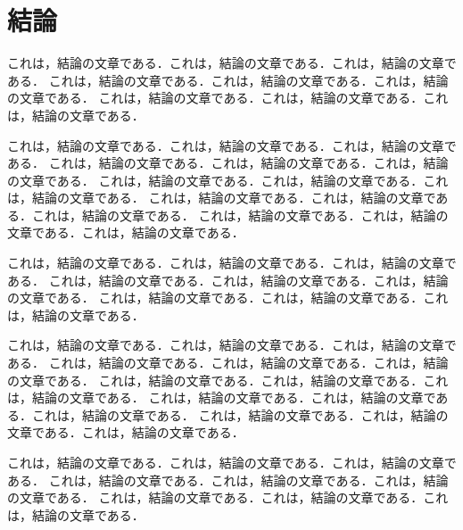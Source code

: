 \chapter{結論} \label{chap:conclusion}

これは，結論の文章である．これは，結論の文章である．これは，結論の文章である．
これは，結論の文章である．これは，結論の文章である．これは，結論の文章である．
これは，結論の文章である．これは，結論の文章である．これは，結論の文章である．

これは，結論の文章である．これは，結論の文章である．これは，結論の文章である．
これは，結論の文章である．これは，結論の文章である．これは，結論の文章である．
これは，結論の文章である．これは，結論の文章である．これは，結論の文章である．
これは，結論の文章である．これは，結論の文章である．これは，結論の文章である．
これは，結論の文章である．これは，結論の文章である．これは，結論の文章である．

これは，結論の文章である．これは，結論の文章である．これは，結論の文章である．
これは，結論の文章である．これは，結論の文章である．これは，結論の文章である．
これは，結論の文章である．これは，結論の文章である．これは，結論の文章である．

これは，結論の文章である．これは，結論の文章である．これは，結論の文章である．
これは，結論の文章である．これは，結論の文章である．これは，結論の文章である．
これは，結論の文章である．これは，結論の文章である．これは，結論の文章である．
これは，結論の文章である．これは，結論の文章である．これは，結論の文章である．
これは，結論の文章である．これは，結論の文章である．これは，結論の文章である．

これは，結論の文章である．これは，結論の文章である．これは，結論の文章である．
これは，結論の文章である．これは，結論の文章である．これは，結論の文章である．
これは，結論の文章である．これは，結論の文章である．これは，結論の文章である．
